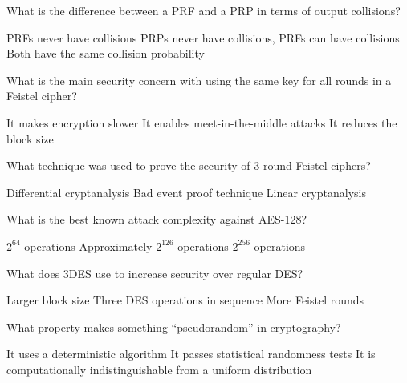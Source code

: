 \documentclass[10pt,a4paper,american]{exam}
\begin{document}
\begin{questions}
	\question What is the difference between a PRF and a PRP in terms of output collisions?
	\begin{randomizechoices}
		\choice PRFs never have collisions
		\CorrectChoice PRPs never have collisions, PRFs can have collisions
		\choice Both have the same collision probability
	\end{randomizechoices}

	\question What is the main security concern with using the same key for all rounds in a Feistel cipher?
	\begin{randomizechoices}
		\choice It makes encryption slower
		\CorrectChoice It enables meet-in-the-middle attacks
		\choice It reduces the block size
	\end{randomizechoices}

	\question What technique was used to prove the security of 3-round Feistel ciphers?
	\begin{randomizechoices}
		\choice Differential cryptanalysis
		\CorrectChoice Bad event proof technique
		\choice Linear cryptanalysis
	\end{randomizechoices}

	\question What is the best known attack complexity against AES-128?
	\begin{randomizechoices}
		\choice $2^{64}$ operations
		\CorrectChoice Approximately $2^{126}$ operations
		\choice $2^{256}$ operations
	\end{randomizechoices}

	\question What does 3DES use to increase security over regular DES?
	\begin{randomizechoices}
		\choice Larger block size
		\CorrectChoice Three DES operations in sequence
		\choice More Feistel rounds
	\end{randomizechoices}

	\question What property makes something ``pseudorandom'' in cryptography?
	\begin{randomizechoices}
		\choice It uses a deterministic algorithm
		\choice It passes statistical randomness tests
		\CorrectChoice It is computationally indistinguishable from a uniform distribution
	\end{randomizechoices}

\end{questions}

\clearpage

\end{document}
